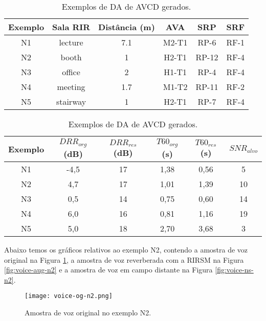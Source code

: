 \begin{table} [H]
    \centering
    \caption{Exemplos de DA de AVCD gerados.}
    \label{tbl:da-noise}
    \begin{tabular}{c|c|c|c|c|c}

        \textbf{Exemplo} & 
        \textbf{Sala RIR} & 
        \textbf{Distância (m)} &
        \textbf{AVA} &
        \textbf{SRP} &
        \textbf{SRF} \\
        \hline 

        N1 & lecture & 7.1 & M2-T1 & RP-6 & RF-1 \\
        N2 & booth & 1 & H2-T1 & RP-12 & RF-4 \\
        N3 & office & 2 & H1-T1 & RP-4 & RF-4 \\
        N4 & meeting & 1.7 & M1-T2 & RP-11 & RF-2 \\
        N5 & stairway & 1 & H2-T1 & RP-7 & RF-4 \\

    \end{tabular}
    \bigbreak
    \bigbreak
    \begin{tabular}{c|c|c|c|c|c}

        \textbf{Exemplo} & 
        \textbf{$DRR_{org}$ (dB)} & 
        \textbf{$DRR_{res}$ (dB)} & 
        \textbf{$T60_{org}$ (s)} & 
        \textbf{$T60_{res}$ (s)} &
        \textbf{$SNR_{alvo}$} \\
        \hline 

        N1 & -4,5 & 17 & 1,38 & 0,56 & 5 \\
        N2 & 4,7 & 17 & 1,01 & 1,39 & 10 \\
        N3 & 0,5 & 14 & 0,75 & 0,60 & 14 \\
        N4 & 6,0 & 16 & 0,81 & 1,16 & 19 \\
        N5 & 5,0 & 18 & 2,70 & 3,68 & 3 \\

    \end{tabular}
\end{table}

Abaixo temos os gráficos relativos ao exemplo N2, contendo a amostra de voz original na Figura \ref{fig:voice-og-n2}, a amostra de voz reverberada
com a RIRSM na Figura \ref{fig:voice-aug-n2} e a amostra de voz em campo distante na Figura \ref{fig:voice-ns-n2}.

\begin{figure} [H]
    \centering
    \texttt{[image: voice-og-n2.png]}
    \caption{Amostra de voz original no exemplo N2.}
    \label{fig:voice-og-n2}
\end{figure} 

